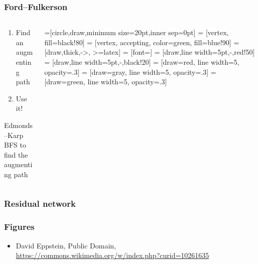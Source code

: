 	\begin{frame}[fragile]
	\frametitle{Ford--Fulkerson}
	\begin{columns}
		\begin{column}{0.45\textwidth}
	\begin{enumerate}
		\item
		  Find an augmenting path
	\item
		  Use it!
	\end{enumerate}
	\begin{block}{Edmonds--Karp}
	BFS to find the augmenting path
	\end{block}
	\end{column}
	\begin{column}{0.45\textwidth}
		=[circle,draw,minimum size=20pt,inner sep=0pt]
	 = [vertex, fill=black!80]
	 = [vertex, accepting, color=green, fill=blue!90]
	 = [draw,thick,->, >=latex]
	 = [font=\small]
	 = [draw,line width=5pt,-,red!50]
	 = [draw,line width=5pt,-,black!20]
     = [draw=red, line width=5,  opacity=.3]
     = [draw=gray, line width=5, opacity=.3]
     = [draw=green, line width=5, opacity=.3]

	\end{column}
	\end{columns}
	\end{frame}

	\begin{frame}[fragile]
	\frametitle{Residual network}
	\end{frame}

\begin{frame}[fragile]
	\frametitle{Figures}

	\begin{itemize}
		\item
		      David Eppstein, Public Domain, \url{https://commons.wikimedia.org/w/index.php?curid=10261635}
	\end{itemize}
\end{frame}


